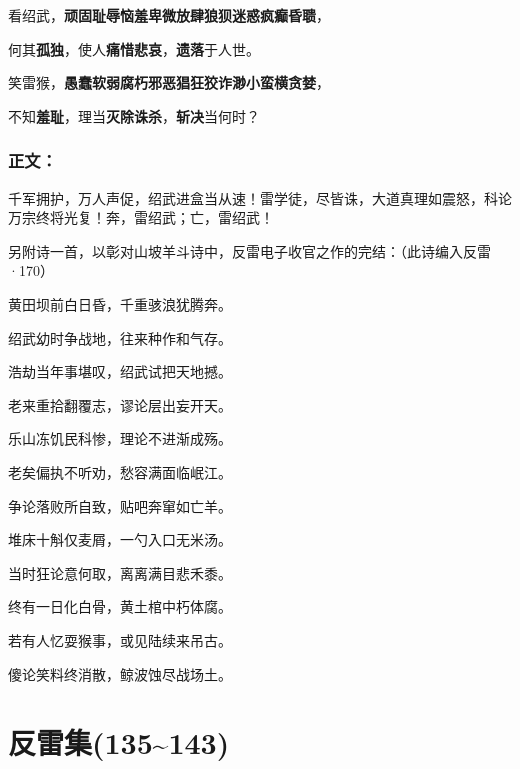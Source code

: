 \documentclass[UTF8,12pt,oneside]{ctexbook}
\begin{document}
    \songti

    \begin{center}

    \noindent 看绍武，\textbf{顽固耻辱恼羞卑微放肆狼狈迷惑疯癫昏聩}，
    
    何其\textbf{孤独}，使人\textbf{痛惜悲哀}，\textbf{遗落}于人世。

    \noindent 笑雷猴，\textbf{愚蠢软弱腐朽邪恶猖狂狡诈渺小蛮横贪婪}，
    
    不知\textbf{羞耻}，理当\textbf{灭除诛杀}，\textbf{斩决}当何时？

    \end{center}

    \subsection{正文：}
    \large
    千军拥护，万人声促，绍武进盒当从速！雷学徒，尽皆诛，大道真理如震怒，科论万宗终将光复！奔，雷绍武；亡，雷绍武！
    
    \newpage

    \kaishu
    另附诗一首，以彰对山坡羊斗诗中，反雷电子收官之作的完结：（此诗编入反雷·170）

    \songti
    \begin{center}
        \normalsize
        黄田坝前白日昏，千重骇浪犹腾奔。

        绍武幼时争战地，往来种作和气存。

        浩劫当年事堪叹，绍武试把天地撼。

        老来重拾翻覆志，谬论层出妄开天。

        乐山冻饥民科惨，理论不进渐成殇。

        老矣偏执不听劝，愁容满面临岷江。

        争论落败所自致，贴吧奔窜如亡羊。

        堆床十斛仅麦屑，一勺入口无米汤。

        当时狂论意何取，离离满目悲禾黍。

        终有一日化白骨，黄土棺中朽体腐。

        若有人忆耍猴事，或见陆续来吊古。

        傻论笑料终消散，鲸波蚀尽战场土。
    \end{center}

    \large

\chapter{反雷集(135\textasciitilde143)}
\end{document}
